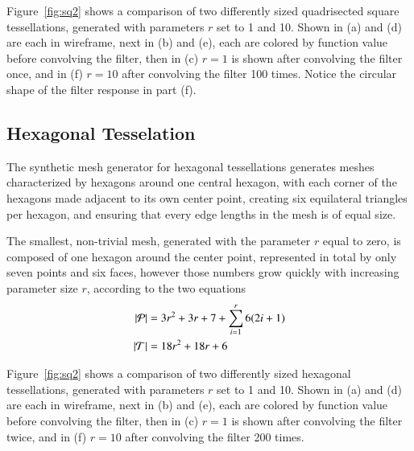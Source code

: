 Figure~\ref{fig:sq2} shows a comparison of two differently sized quadrisected square tessellations, generated with parameters $r$ set to 1 and 10. Shown in (a) and (d) are each in wireframe, next in (b) and (e), each are colored by function value before convolving the filter, then in (c) $r=1$ is shown after convolving the filter once, and in (f) $r=10$ after convolving the filter 100 times. Notice the circular shape of the filter response in part (f).



%
%
%
%
\pagebreak
\subsection{Hexagonal Tesselation}
\label{ch6sSTDDssHT}
The synthetic mesh generator for hexagonal tessellations generates meshes characterized by hexagons around one central hexagon, with each corner of the hexagons made adjacent to its own center point, creating six equilateral triangles per hexagon, and ensuring that every edge lengths in the mesh is of equal size.

The smallest, non-trivial mesh, generated with the parameter $r$ equal to zero, is composed of one hexagon around the center point, represented in total by only seven points and six faces, however those numbers grow quickly with increasing parameter size $r$, according to the two equations
\begin{align}
	|\mathcal{P}| &= 3r^2 + 3r + 7 +\sum_{i=1}^r{6(2i + 1)}\\
	|\mathcal{T}| &= 18r^2 + 18r + 6
	\label{eq:hexPointAndFaceCounts}
\end{align}

Figure~\ref{fig:sq2} shows a comparison of two differently sized hexagonal tessellations, generated with parameters $r$ set to 1 and 10. Shown in (a) and (d) are each in wireframe, next in (b) and (e), each are colored by function value before convolving the filter, then in (c) $r=1$ is shown after convolving the filter twice, and in (f) $r=10$ after convolving the filter 200 times.



%
%
%
%
\pagebreak
